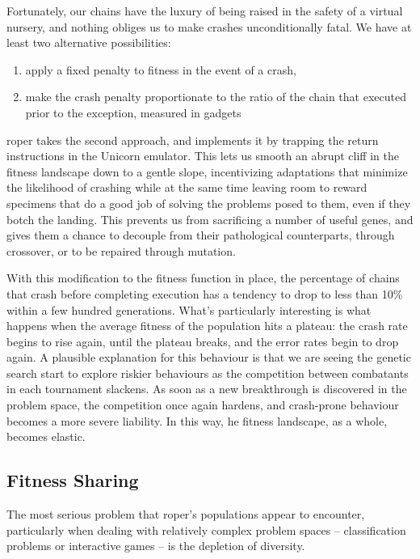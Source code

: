 \documentclass[12pt,glossary]{dalthesis}
\begin{document}
Fortunately, our chains have the luxury of being raised in the safety of a
virtual nursery, and nothing obliges us to make crashes unconditionally fatal.
We have at least two alternative possibilities:

\begin{enumerate}
\item apply a fixed penalty to fitness in the event of a crash,
\item make the crash penalty proportionate to the ratio of
the chain that executed prior to the exception, measured in gadgets
\end{enumerate}

\Gls{roper} takes the second approach, and implements it by
trapping the return instructions in the Unicorn emulator. This lets us smooth an
abrupt cliff in the fitness landscape down to a gentle slope, incentivizing
adaptations that minimize the likelihood of crashing while at the same time
leaving room to reward specimens that do a good job of solving the
problems posed to them, even if they botch the landing. This prevents us from
sacrificing a number of useful genes, and gives them a chance to decouple from
their pathological counterparts, through crossover, or to be repaired through
mutation.

With this modification to the fitness function in place, the percentage of
chains that crash before completing execution has a tendency to drop to less
than 10\% within a few hundred generations.  What's
particularly interesting is what happens when the average fitness of the
population hits a plateau: the crash rate begins to rise again, until the
plateau breaks, and the error rates begin to drop again. A plausible explanation
for this behaviour is that we are seeing the genetic search start to explore
riskier behaviours as the competition between combatants in each tournament
slackens. As soon as a new
breakthrough is discovered in the problem space, the competition once again
hardens, and crash-prone behaviour becomes a more severe liability. In this way,
he fitness landscape, as a whole, becomes elastic.

\subsection{Fitness Sharing}
\label{sec:org669b23c}
\label{orgffa0128}

The most serious problem that \gls{roper}'s populations appear to encounter, particularly
when dealing with relatively complex problem spaces -- classification problems or
interactive games -- is the depletion of diversity. 
\end{document}
